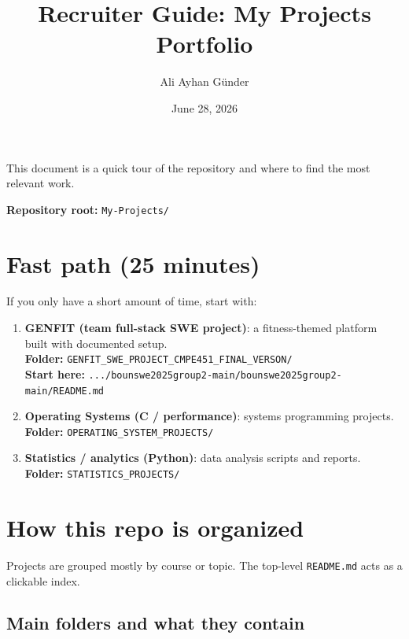 \documentclass[11pt]{article}
\title{Recruiter Guide: My Projects Portfolio}
\author{Ali Ayhan G{\"u}nder}
\date{June 28, 2026}
\begin{document}
\maketitle

This document is a quick tour of the repository and where to find the most relevant work.

\noindent\textbf{Repository root:} \texttt{My-Projects/}

\tableofcontents

\newpage

\section{Fast path (25 minutes)}
If you only have a short amount of time, start with:
\begin{enumerate}
    \item \textbf{GENFIT (team full-stack SWE project)}: a fitness-themed platform built with documented setup.
    \\ \textbf{Folder:} \texttt{GENFIT\_SWE\_PROJECT\_CMPE451\_FINAL\_VERSON/}
    \\ \textbf{Start here:} \texttt{.../bounswe2025group2-main/bounswe2025group2-main/README.md}
    
    \item \textbf{Operating Systems (C / performance)}: systems programming projects.
    \\ \textbf{Folder:} \texttt{OPERATING\_SYSTEM\_PROJECTS/}
    
    \item \textbf{Statistics / analytics (Python)}: data analysis scripts and reports.
    \\ \textbf{Folder:} \texttt{STATISTICS\_PROJECTS/}
\end{enumerate}

\section{How this repo is organized}
Projects are grouped mostly by course or topic. The top-level \texttt{README.md} acts as a clickable index.

\subsection{Main folders and what they contain}
\end{document}
